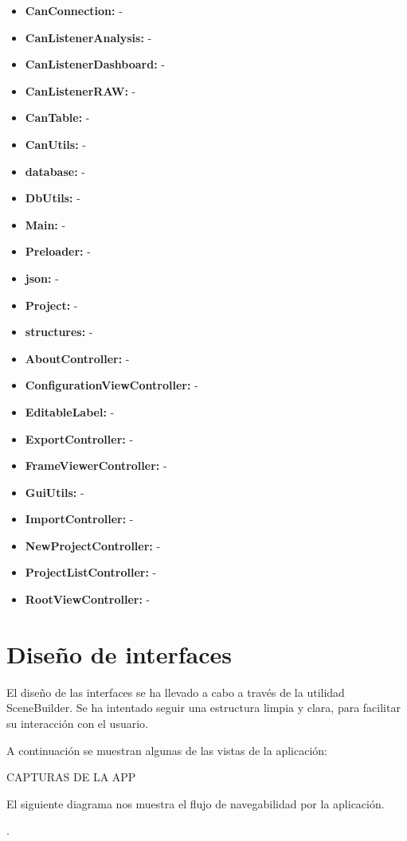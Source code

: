 


\begin{itemize}
\item
\textbf{CanConnection:} -
\item
\textbf{CanListenerAnalysis:} -
\item
\textbf{CanListenerDashboard:} -
\item
\textbf{CanListenerRAW:} -
\item
\textbf{CanTable:} -
\item
\textbf{CanUtils:} -
\item
\textbf{database:} -
\item
\textbf{DbUtils:} -
\item
\textbf{Main:} -
\item
\textbf{Preloader:} -
\item
\textbf{json:} -
\item
\textbf{Project:} -
\item
\textbf{structures:} -
\item
\textbf{AboutController:} -
\item
\textbf{ConfigurationViewController:} -
\item
\textbf{EditableLabel:} -
\item
\textbf{ExportController:} -
\item
\textbf{FrameViewerController:} -
\item
\textbf{GuiUtils:} -
\item
\textbf{ImportController:} -
\item
\textbf{NewProjectController:} -
\item
\textbf{ProjectListController:} -
\item
\textbf{RootViewController:} -
\end{itemize}


\section{Diseño de interfaces}

El diseño de las interfaces se ha llevado a cabo a través de la utilidad SceneBuilder. Se ha intentado seguir una estructura limpia y clara, para facilitar su interacción con el usuario.

A continuación se muestran algunas de las vistas de la aplicación:

CAPTURAS DE LA APP

El siguiente diagrama nos muestra el flujo de navegabilidad por la aplicación.


.
